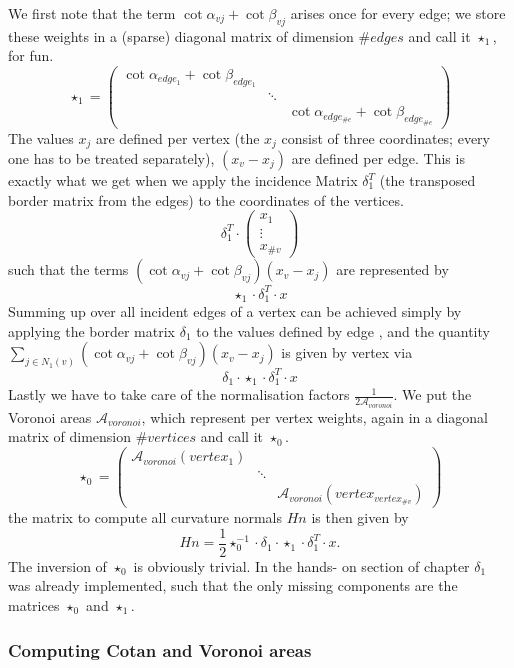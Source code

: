 We first note that the term $\cot \alpha_{vj} + \cot \beta_{vj}$ arises once for every edge; we store these weights in a (sparse) diagonal matrix of dimension $\# edges$ and call it $\star_1$, for fun.
\[\star_1 = \begin{pmatrix}
\cot \alpha_{edge_1} + \cot \beta_{edge_1} & & \\
& \ddots & \\
& & \cot \alpha_{edge_{\#e}} + \cot \beta_{edge_{\#e}}
\end{pmatrix}\]
The values $x_j$ are defined per vertex (the $x_j$ consist of three coordinates; every one has to be treated separately), $(x_v-x_j)$ are defined per edge. This is exactly what we get when we apply the incidence Matrix $\delta_1^T$ (the transposed border matrix from the edges) to the coordinates of the vertices.
\[\delta_1^T \cdot \begin{pmatrix}
x_1 \\
\vdots\\
x_{\#v}
\end{pmatrix}\]
such that the terms $(\cot \alpha_{vj} + \cot \beta_{vj})(x_v-x_j)$ are represented by 
\[\star_1\cdot \delta_1^T \cdot x\]
Summing up over all incident edges  of a vertex can be achieved simply by applying the border matrix $\delta_1$ to the values defined by edge , and the quantity $\sum_{j\in N_1(v)} (\cot \alpha_{vj} + \cot \beta_{vj})(x_v-x_j)$ is given by vertex via
\[\delta_1\cdot\star_1\cdot \delta_1^T \cdot x\]
Lastly we have to take care of the normalisation factors $\frac{1}{2 \mathcal A_{voronoi}}$. We put the Voronoi areas $\mathcal A_{voronoi}$, which represent per vertex weights, again in a diagonal matrix of dimension $\# vertices$ and call it $\star_0$.
\[\star_0 =\begin{pmatrix}
\mathcal A_{voronoi}(vertex_1) & & \\
& \ddots & \\
& & \mathcal A_{voronoi}(vertex_{vertex_{\#v}})
\end{pmatrix}\] 
the matrix to compute all curvature normals $Hn$ is then given by
\[Hn = \frac{1}{2} \star_0^{-1}\cdot\delta_1\cdot\star_1\cdot \delta_1^T \cdot x .\]
The inversion of $\star_0$ is obviously trivial. In the hands- on section of chapter \note{ } $\delta_1$ was already implemented, such that the only missing components are the matrices $\star_0$ and $\star_1$.

\subsubsection*{Computing Cotan and Voronoi areas}



